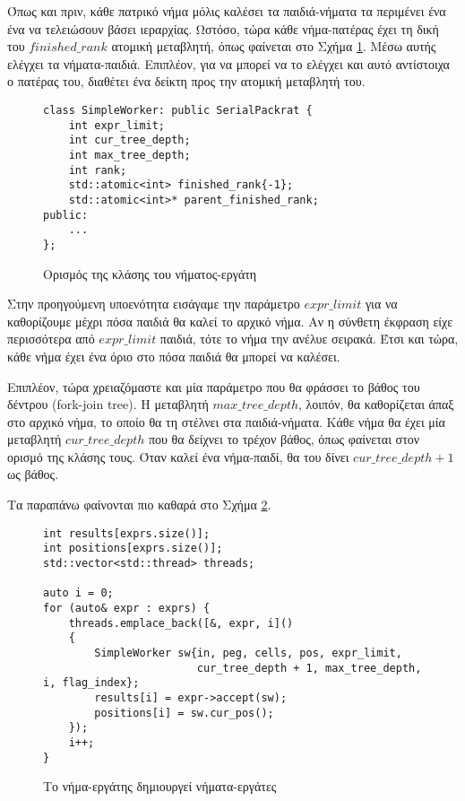 Όπως και πριν, κάθε πατρικό νήμα μόλις καλέσει τα παιδιά-νήματα τα περιμένει ένα ένα να τελειώσουν βάσει ιεραρχίας.
Ωστόσο, τώρα κάθε νήμα-πατέρας έχει τη δική του $finished\_rank$ ατομική μεταβλητή, όπως φαίνεται στο Σχήμα \ref{fig:rec_top_down_worker}.
Μέσω αυτής ελέγχει τα νήματα-παιδιά.
Επιπλέον, για να μπορεί να το ελέγχει και αυτό αντίστοιχα ο πατέρας του, διαθέτει ένα δείκτη προς την ατομική μεταβλητή του.

\begin{figure}[h]
\setlength\partopsep{-\topsep}%
\begin{verbatim}
class SimpleWorker: public SerialPackrat {
    int expr_limit;
    int cur_tree_depth;
    int max_tree_depth;
    int rank;
    std::atomic<int> finished_rank{-1};
    std::atomic<int>* parent_finished_rank;
public:
    ...
};

\end{verbatim}
\caption{Ορισμός της κλάσης του νήματος-εργάτη}
\label{fig:rec_top_down_worker}
\end{figure}

Στην προηγούμενη υποενότητα εισάγαμε την παράμετρο $expr\_limit$ για να καθορίζουμε μέχρι πόσα παιδιά θα καλεί το αρχικό νήμα.
Αν η σύνθετη έκφραση είχε περισσότερα από $expr\_limit$ παιδιά, τότε το νήμα την ανέλυε σειρακά.
Έτσι και τώρα, κάθε νήμα έχει ένα όριο στο πόσα παιδιά θα μπορεί να καλέσει.

Επιπλέον, τώρα χρειαζόμαστε και μία παράμετρο που θα φράσσει το βάθος του δέντρου (fork-join tree).
Η μεταβλητή $max\_tree\_depth$, λοιπόν, θα καθορίζεται άπαξ στο αρχικό νήμα, το οποίο θα τη στέλνει στα παιδιά-νήματα.
Κάθε νήμα θα έχει μία μεταβλητή $cur\_tree\_depth$ που θα δείχνει το τρέχον βάθος, όπως φαίνεται στον ορισμό της κλάσης τους.
Όταν καλεί ένα νήμα-παιδί, θα του δίνει $cur\_tree\_depth + 1$ ως βάθος.

Τα παραπάνω φαίνονται πιο καθαρά στο Σχήμα \ref{fig:rec_top_down_spawn}.
\begin{figure}[h]
\setlength\partopsep{-\topsep}%
\begin{verbatim}
int results[exprs.size()];
int positions[exprs.size()];
std::vector<std::thread> threads;

auto i = 0;
for (auto& expr : exprs) {
    threads.emplace_back([&, expr, i]()
    {
        SimpleWorker sw{in, peg, cells, pos, expr_limit, 
                        cur_tree_depth + 1, max_tree_depth, i, flag_index};
        results[i] = expr->accept(sw);
        positions[i] = sw.cur_pos();
    });
    i++;
}
\end{verbatim}
  \caption{Tο νήμα-εργάτης δημιουργεί νήματα-εργάτες}
\label{fig:rec_top_down_spawn}
\end{figure}

